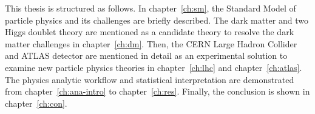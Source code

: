 \par This thesis is structured as follows. 
In chapter~\ref{ch:sm}, the Standard Model of particle physics and its challenges are briefly described. The dark matter and two Higgs doublet theory are mentioned as a candidate theory to resolve the dark matter challenges in chapter~\ref{ch:dm}. 
Then, the CERN Large Hadron Collider and ATLAS detector are mentioned in detail as an experimental solution to examine new particle physics theories in chapter~\ref{ch:lhc} and chapter~\ref{ch:atlas}. 
The physics analytic workflow and statistical interpretation are demonstrated from chapter~\ref{ch:ana-intro} to chapter~\ref{ch:res}. 
Finally, the conclusion is shown in chapter~\ref{ch:con}.
